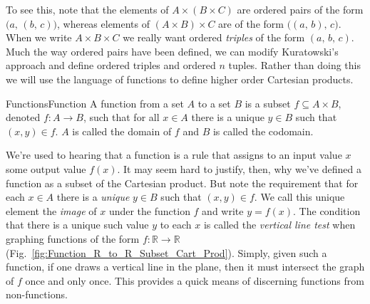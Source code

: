         To see this, note that the elements of $A\times(B\times{C})$ are
        ordered pairs of the form $\big(a,\,(b,\,c)\big)$, whereas elements of
        $(A\times{B})\times{C}$ are of the form $\big((a,\,b),\,c\big)$. When
        we write $A\times{B}\times{C}$ we really want ordered \textit{triples}
        of the form $(a,\,b,\,c)$.
        Much the way ordered pairs have been defined, we can modify Kuratowski's
        approach and define ordered triples and ordered
        $n$ tuples. Rather than doing this we will use
        the language of functions to define higher order Cartesian products.
        \begin{fdefinition}{Functions}{Function}
            A \gls{function} from a \gls{set} $A$ to a set $B$ is a \gls{subset}
            $f\subseteq{A}\times{B}$, denoted $f:A\rightarrow{B}$, such that
            for all $x\in{A}$ there is a unique $y\in{B}$ such that
            $(x,y)\in{f}$. $A$ is called the domain of $f$
            and $B$ is called the codomain.
        \end{fdefinition}
        We're used to hearing that a function is a rule that assigns to an
        input value $x$ some output value $f(x)$. It may seem hard to justify,
        then, why we've defined a function as a subset of the Cartesian
        product. But note the requirement that for each $x\in{A}$ there is a
        \textit{unique} $y\in{B}$ such that $(x,y)\in{f}$. We call this unique
        element the \textit{image} of $x$ under the function $f$ and write
        $y=f(x)$. The condition that there is a unique such value $y$ to each
        $x$ is called the \textit{vertical line test}
        when graphing functions of the form $f:\mathbb{R}\rightarrow\mathbb{R}$
        (Fig.~\ref{fig:Function_R_to_R_Subset_Cart_Prod}). Simply, given such
        a function, if one draws a vertical line in the plane, then it must
        intersect the graph of $f$ once and only once. This provides a
        quick means of discerning functions from non-functions.
